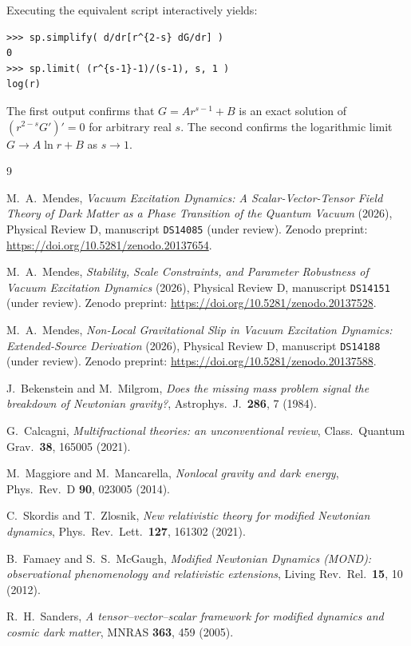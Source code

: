 \documentclass[aps,prd,twocolumn,superscriptaddress,nofootinbib]{revtex4-2}
\begin{document}
Executing the equivalent script interactively yields:
\begin{verbatim}
>>> sp.simplify( d/dr[r^{2-s} dG/dr] )
0
>>> sp.limit( (r^{s-1}-1)/(s-1), s, 1 )
log(r)
\end{verbatim}
\noindent
The first output confirms that $G = Ar^{s-1}+B$ is an exact solution
of $(r^{2-s}G')'=0$ for arbitrary real $s$. The second confirms the
logarithmic limit $G \to A\ln r + B$ as $s\to 1$.

\begin{thebibliography}{9}

M.~A.\ Mendes, \emph{Vacuum Excitation Dynamics: A
Scalar-Vector-Tensor Field Theory of Dark Matter as a Phase
Transition of the Quantum Vacuum} (2026), Physical Review D,
manuscript \texttt{DS14085} (under review). Zenodo preprint:
\url{https://doi.org/10.5281/zenodo.20137654}.

M.~A.\ Mendes, \emph{Stability, Scale Constraints, and Parameter
Robustness of Vacuum Excitation Dynamics} (2026), Physical Review
D, manuscript \texttt{DS14151} (under review). Zenodo preprint:
\url{https://doi.org/10.5281/zenodo.20137528}.

M.~A.\ Mendes, \emph{Non-Local Gravitational Slip in Vacuum
Excitation Dynamics: Extended-Source Derivation} (2026), Physical
Review D, manuscript \texttt{DS14188} (under review). Zenodo
preprint: \url{https://doi.org/10.5281/zenodo.20137588}.

J.~Bekenstein and M.~Milgrom,
\emph{Does the missing mass problem signal the breakdown of
Newtonian gravity?},
Astrophys.\ J.\ \textbf{286}, 7 (1984).

G.~Calcagni,
\emph{Multifractional theories: an unconventional review},
Class.\ Quantum Grav.\ \textbf{38}, 165005 (2021).

M.~Maggiore and M.~Mancarella,
\emph{Nonlocal gravity and dark energy},
Phys.\ Rev.\ D \textbf{90}, 023005 (2014).

C.~Skordis and T.~Zlosnik,
\emph{New relativistic theory for modified Newtonian dynamics},
Phys.\ Rev.\ Lett.\ \textbf{127}, 161302 (2021).

B.~Famaey and S.~S.\ McGaugh,
\emph{Modified Newtonian Dynamics (MOND): observational
phenomenology and relativistic extensions},
Living Rev.\ Rel.\ \textbf{15}, 10 (2012).

R.~H.\ Sanders,
\emph{A tensor--vector--scalar framework for modified dynamics
and cosmic dark matter},
MNRAS \textbf{363}, 459 (2005).

\end{thebibliography}
\end{document}
